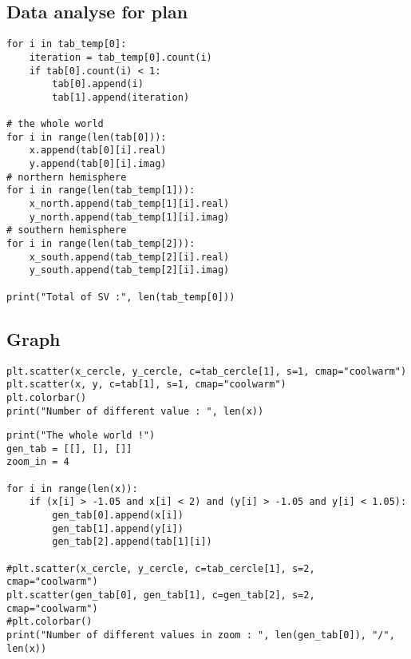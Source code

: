 \subsection{Data analyse for plan}

\begin{lstlisting}
for i in tab_temp[0]:
    iteration = tab_temp[0].count(i)
    if tab[0].count(i) < 1:
        tab[0].append(i)
        tab[1].append(iteration)

# the whole world
for i in range(len(tab[0])):
    x.append(tab[0][i].real)
    y.append(tab[0][i].imag)
# northern hemisphere
for i in range(len(tab_temp[1])):
    x_north.append(tab_temp[1][i].real)
    y_north.append(tab_temp[1][i].imag)
# southern hemisphere
for i in range(len(tab_temp[2])):
    x_south.append(tab_temp[2][i].real)
    y_south.append(tab_temp[2][i].imag)

print("Total of SV :", len(tab_temp[0]))
\end{lstlisting}

\subsection{Graph}

\begin{lstlisting}
plt.scatter(x_cercle, y_cercle, c=tab_cercle[1], s=1, cmap="coolwarm")
plt.scatter(x, y, c=tab[1], s=1, cmap="coolwarm")
plt.colorbar()
print("Number of different value : ", len(x))
\end{lstlisting}

\begin{lstlisting}
print("The whole world !")
gen_tab = [[], [], []]
zoom_in = 4

for i in range(len(x)):
    if (x[i] > -1.05 and x[i] < 2) and (y[i] > -1.05 and y[i] < 1.05):
        gen_tab[0].append(x[i])
        gen_tab[1].append(y[i])
        gen_tab[2].append(tab[1][i])

#plt.scatter(x_cercle, y_cercle, c=tab_cercle[1], s=2, cmap="coolwarm")
plt.scatter(gen_tab[0], gen_tab[1], c=gen_tab[2], s=2, cmap="coolwarm")
#plt.colorbar()
print("Number of different values in zoom : ", len(gen_tab[0]), "/", len(x))
\end{lstlisting}




